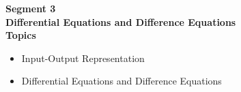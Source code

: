 \begin{frame}
\textbf{Segment 3\\
Differential Equations and Difference Equations\\
Topics}
 \begin{itemize}
   \item Input-Output Representation
   \item Differential Equations and Difference Equations
\end{itemize}
\end{frame}


% 
%

